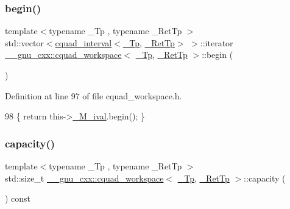 \subsubsection{\texorpdfstring{begin()}{begin()}}
{\footnotesize\ttfamily template$<$typename \+\_\+\+Tp , typename \+\_\+\+Ret\+Tp $>$ \\
std\+::vector$<$\hyperlink{struct____gnu__cxx_1_1cquad__interval}{cquad\+\_\+interval}$<$\hyperlink{namespace____gnu__cxx_a3b19a9c800ca194374ef9172290f7d79}{\+\_\+\+Tp}, \hyperlink{namespace____gnu__cxx_a886e03ece3d53ff7fa6c098a40f93fa5}{\+\_\+\+Ret\+Tp}$>$ $>$\+::iterator \hyperlink{struct____gnu__cxx_1_1cquad__workspace}{\+\_\+\+\_\+gnu\+\_\+cxx\+::cquad\+\_\+workspace}$<$ \hyperlink{namespace____gnu__cxx_a3b19a9c800ca194374ef9172290f7d79}{\+\_\+\+Tp}, \hyperlink{namespace____gnu__cxx_a886e03ece3d53ff7fa6c098a40f93fa5}{\+\_\+\+Ret\+Tp} $>$\+::begin (\begin{DoxyParamCaption}{ }\end{DoxyParamCaption})\hspace{0.3cm}{\ttfamily [inline]}}



Definition at line 97 of file cquad\+\_\+workspace.\+h.


\begin{DoxyCode}
98       \{ \textcolor{keywordflow}{return} this->\hyperlink{struct____gnu__cxx_1_1cquad__workspace_a46edeb05c52f2a406dc582b404fe83e6}{\_M\_ival}.begin(); \}
\end{DoxyCode}
\mbox{\label{struct____gnu__cxx_1_1cquad__workspace_a379ef600e71c787579e107ffef46fcdf}} 
\subsubsection{\texorpdfstring{capacity()}{capacity()}}
{\footnotesize\ttfamily template$<$typename \+\_\+\+Tp , typename \+\_\+\+Ret\+Tp $>$ \\
std\+::size\+\_\+t \hyperlink{struct____gnu__cxx_1_1cquad__workspace}{\+\_\+\+\_\+gnu\+\_\+cxx\+::cquad\+\_\+workspace}$<$ \hyperlink{namespace____gnu__cxx_a3b19a9c800ca194374ef9172290f7d79}{\+\_\+\+Tp}, \hyperlink{namespace____gnu__cxx_a886e03ece3d53ff7fa6c098a40f93fa5}{\+\_\+\+Ret\+Tp} $>$\+::capacity (\begin{DoxyParamCaption}{ }\end{DoxyParamCaption}) const\hspace{0.3cm}{\ttfamily [inline]}}



